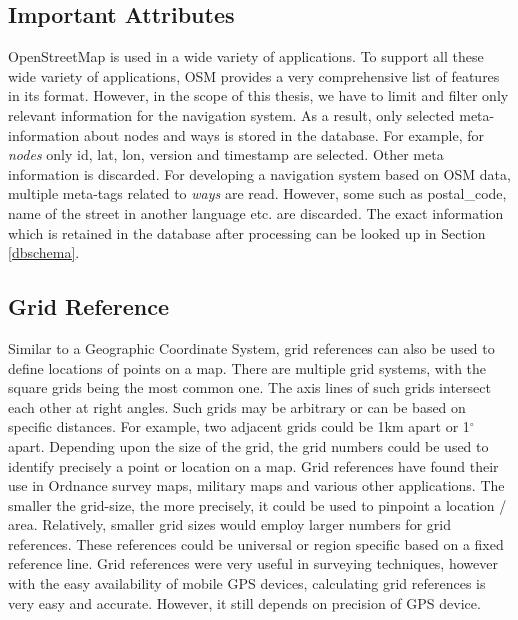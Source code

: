 \subsection{Important Attributes}\label{osmattributes}
OpenStreetMap is used in a wide variety of applications. To support all these wide variety of applications, OSM provides a very comprehensive list of features in its format. However, in the scope of this thesis, we have to limit and filter only relevant information for the navigation system. As a result, only selected meta-information about nodes and ways is stored in the database. For example, for \textit{nodes} only id, lat, lon, version and timestamp are selected. Other meta information is discarded. For developing a navigation system based on OSM data, multiple meta-tags related to \textit{ways} are read. However, some such as postal{\_}code, name of the street in another language etc. are discarded. The exact information which is retained in the database after processing can be looked up in Section \ref{dbschema}.

\subsection{Grid Reference} \label{grids}
Similar to a Geographic Coordinate System, grid references can also be used to define locations of points on a map. There are multiple grid systems, with the square grids being the most common one. The axis lines of such grids intersect each other at right angles. Such grids may be arbitrary or can be based on specific distances. For example, two adjacent grids could be 1km apart or 1$^{\circ}$ apart. Depending upon the size of the grid, the grid numbers could be used to identify precisely a point or location on a map. Grid references have found their use in Ordnance survey maps, military maps and various other applications. The smaller the grid-size, the more precisely, it could be used to pinpoint a location / area. Relatively, smaller grid sizes would employ larger numbers for grid references. These references could be universal or region specific based on a fixed reference line. Grid references were very useful in surveying techniques, however with the easy availability of mobile GPS devices, calculating grid references is very easy and accurate. However, it still depends on precision of GPS device.\\



